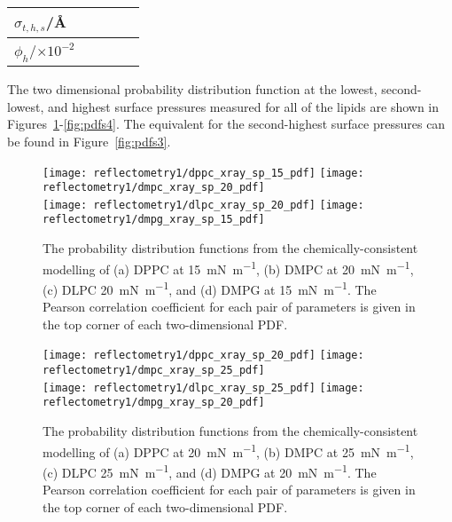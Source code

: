 \begin{table}
\begin{tabular}{l | l l l l}
        $\sigma_{t,h,s}$/\si{\angstrom} &  &  &  &  \\
        \midrule
        $\phi_h$/$\times 10^{-2}$ &  &  &  &  \\
        \bottomrule
    \end{tabular}
\end{table}
%
The two dimensional probability distribution function at the lowest, second-lowest, and highest surface pressures measured for all of the lipids are shown in Figures~\ref{fig:pdfs1}-\ref{fig:pdfs4}. The equivalent for the second-highest surface pressures can be found in Figure~\ref{fig:pdfs3}.
%
\begin{figure}
    \centering
    \texttt{[image: reflectometry1/dppc\_xray\_sp\_15\_pdf]}
    \texttt{[image: reflectometry1/dmpc\_xray\_sp\_20\_pdf]} \\
    \texttt{[image: reflectometry1/dlpc\_xray\_sp\_20\_pdf]}
    \texttt{[image: reflectometry1/dmpg\_xray\_sp\_15\_pdf]}
    \caption{The probability distribution functions from the chemically-consistent modelling of (a) DPPC at \SI{15}{\milli\newton\per\meter}, (b) DMPC at \SI{20}{\milli\newton\per\meter}, (c) DLPC \SI{20}{\milli\newton\per\meter}, and (d) DMPG at \SI{15}{\milli\newton\per\meter}. The Pearson correlation coefficient for each pair of parameters is given in the top corner of each two-dimensional PDF.}
    \label{fig:pdfs1}
\end{figure}
%
%
\begin{figure}
    \centering
    \texttt{[image: reflectometry1/dppc\_xray\_sp\_20\_pdf]}
    \texttt{[image: reflectometry1/dmpc\_xray\_sp\_25\_pdf]} \\
    \texttt{[image: reflectometry1/dlpc\_xray\_sp\_25\_pdf]}
    \texttt{[image: reflectometry1/dmpg\_xray\_sp\_20\_pdf]}
    \caption{The probability distribution functions from the chemically-consistent modelling of (a) DPPC at \SI{20}{\milli\newton\per\meter}, (b) DMPC at \SI{25}{\milli\newton\per\meter}, (c) DLPC \SI{25}{\milli\newton\per\meter}, and (d) DMPG at \SI{20}{\milli\newton\per\meter}. The Pearson correlation coefficient for each pair of parameters is given in the top corner of each two-dimensional PDF.}
    \label{fig:pdfs2}
\end{figure}
